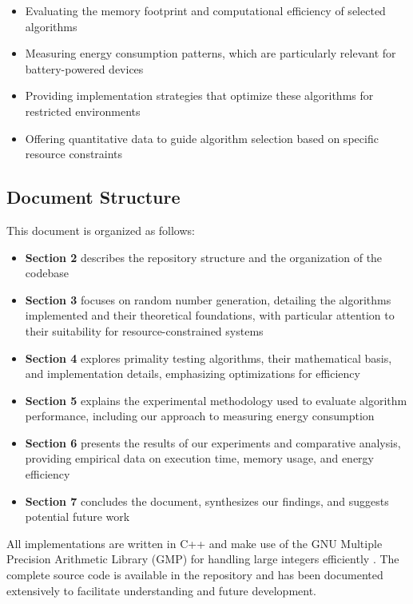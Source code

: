 \begin{itemize}
    \item Evaluating the memory footprint and computational efficiency of selected algorithms
    
    \item Measuring energy consumption patterns, which are particularly relevant for battery-powered devices
    
    \item Providing implementation strategies that optimize these algorithms for restricted environments
    
    \item Offering quantitative data to guide algorithm selection based on specific resource constraints
\end{itemize}

\subsection{Document Structure}

This document is organized as follows:

\begin{itemize}
    \item \textbf{Section 2} describes the repository structure and the organization of the codebase
    
    \item \textbf{Section 3} focuses on random number generation, detailing the algorithms implemented and their theoretical foundations, with particular attention to their suitability for resource-constrained systems
    
    \item \textbf{Section 4} explores primality testing algorithms, their mathematical basis, and implementation details, emphasizing optimizations for efficiency
    
    \item \textbf{Section 5} explains the experimental methodology used to evaluate algorithm performance, including our approach to measuring energy consumption
    
    \item \textbf{Section 6} presents the results of our experiments and comparative analysis, providing empirical data on execution time, memory usage, and energy efficiency
    
    \item \textbf{Section 7} concludes the document, synthesizes our findings, and suggests potential future work
\end{itemize}

All implementations are written in C++ and make use of the GNU Multiple Precision Arithmetic Library (GMP) for handling large integers efficiently \cite{granlund2012}. The complete source code is available in the repository and has been documented extensively to facilitate understanding and future development. 